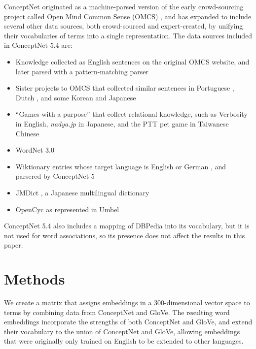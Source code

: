 \documentclass[letterpaper]{article}
\begin{document}
ConceptNet originated as a machine-parsed version of the early crowd-sourcing
project called Open Mind Common Sense (OMCS) \cite{singh2002omcs}, and has expanded
to include several other data sources, both crowd-sourced and expert-created,
by unifying their vocabularies of terms into a single representation.
The data sources included in ConceptNet 5.4 are:

\begin{itemize}
\item Knowledge collected as English sentences on the original OMCS website,
    and later parsed with a pattern-matching parser
\item Sister projects to OMCS that collected similar sentences in Portuguese
    \cite{anacleto2006portuguese},
    Dutch \cite{eckhardt2008kid}, and some Korean and Japanese
    \cite{chung2006globalmind}
\item ``Games with a purpose'' that collect relational knowledge, such as
    Verbosity \cite{vonahn2006verbosity} in English, {\em nadya.jp}
    \cite{nakahara2011nadya} in Japanese, and the PTT pet game \cite{kuo2009petgame}
    in Taiwanese Chinese
\item WordNet 3.0 \cite{miller1998wordnet}
\item Wiktionary entries whose target language is English or German
    \cite{wiktionary2014en} \cite{wiktionary2014de}, and parsered by ConceptNet 5
\item JMDict \cite{breen2004jmdict}, a Japanese multilingual dictionary
\item OpenCyc \cite{matuszek2006cyc} as represented in Umbel \cite{bergman2008umbel}
\end{itemize}

ConceptNet 5.4 also includes a mapping of DBPedia \cite{auer2007dbpedia} into
its vocabulary, but it is not used for word associations, so its presence does
not affect the results in this paper.

\section{Methods}

We create a matrix that assigns embeddings in a 300-dimensional vector
space to terms by combining data from ConceptNet and GloVe. The resulting word
embeddings incorporate the strengths of both ConceptNet and GloVe, and extend
their vocabulary to the union of ConceptNet and GloVe, allowing embeddings that
were originally only trained on English to be extended to other languages.
\end{document}
